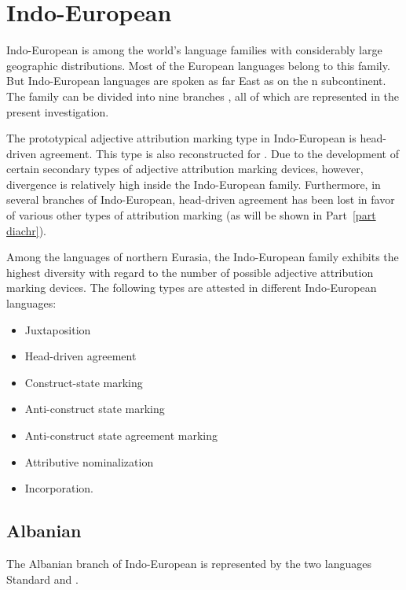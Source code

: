 \section{Indo-European}
Indo-European is among the world's language families with considerably large geographic distributions. Most of the European languages belong to this family. But Indo-European languages are spoken as far East as on the n subcontinent. The family can be divided into nine branches \cite[218]{salminen2007}, all of which are represented in the present investigation.

The prototypical adjective attribution marking type in Indo-European is head-driven agreement. This type is also reconstructed for  \citep{decsy1991,watkins1998}. Due to the development of certain secondary types of adjective attribution marking devices, however, divergence is relatively high inside the Indo-European family. Furthermore, in several branches of Indo-European, head-driven agreement has been lost in favor of various other types of attribution marking (as will be shown in Part~\ref{part diachr}).

Among the languages of northern Eurasia, the Indo-European family exhibits the highest diversity with regard to the number of possible adjective attribution marking devices. The following types are attested in different Indo-European languages:
\begin{itemize}
\item Juxtaposition
\item Head-driven agreement
\item Construct-state marking
\item Anti-construct state marking
\item Anti-construct state agreement marking
\item Attributive nominalization
\item Incorporation.
\end{itemize}

\subsection{Albanian} \label{albanian synchr}
The Albanian branch of Indo-European is represented by the two languages Standard  and .

